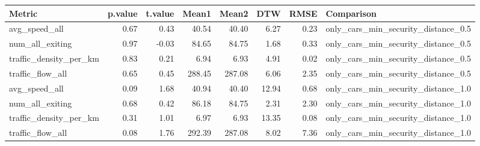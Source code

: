\begin{table}[ht]
\centering
\begin{tabular}{lrrrrrrl}
  \hline
Metric & p.value & t.value & Mean1 & Mean2 & DTW & RMSE & Comparison \\ 
  \hline
avg\_speed\_all & 0.67 & 0.43 & 40.54 & 40.40 & 6.27 & 0.23 & only\_cars\_min\_security\_distance\_0.5 \\ 
  num\_all\_exiting & 0.97 & -0.03 & 84.65 & 84.75 & 1.68 & 0.33 & only\_cars\_min\_security\_distance\_0.5 \\ 
  traffic\_density\_per\_km & 0.83 & 0.21 & 6.94 & 6.93 & 4.91 & 0.02 & only\_cars\_min\_security\_distance\_0.5 \\ 
  traffic\_flow\_all & 0.65 & 0.45 & 288.45 & 287.08 & 6.06 & 2.35 & only\_cars\_min\_security\_distance\_0.5 \\ 
  avg\_speed\_all & 0.09 & 1.68 & 40.94 & 40.40 & 12.94 & 0.68 & only\_cars\_min\_security\_distance\_1.0 \\ 
  num\_all\_exiting & 0.68 & 0.42 & 86.18 & 84.75 & 2.31 & 2.30 & only\_cars\_min\_security\_distance\_1.0 \\ 
  traffic\_density\_per\_km & 0.31 & 1.01 & 6.97 & 6.93 & 13.35 & 0.08 & only\_cars\_min\_security\_distance\_1.0 \\ 
  traffic\_flow\_all & 0.08 & 1.76 & 292.39 & 287.08 & 8.02 & 7.36 & only\_cars\_min\_security\_distance\_1.0 \\ 
   \hline
\end{tabular}
\end{table}
